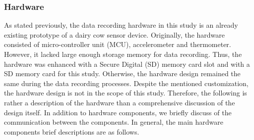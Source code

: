 \documentclass[english,12pt,a4paper,pdftex,elec,utf8]{aaltothesis}
\begin{document}
\subsubsection{Hardware} \label{hardwaresection}

As stated previously, the data recording hardware in this study is an already existing prototype of a dairy cow sensor device. Originally, the hardware consisted of micro-controller unit (MCU), accelerometer and thermometer. However, it lacked large enough storage memory for data recording. Thus, the hardware was enhanced with a Secure Digital (SD) memory card slot and with a SD memory card for this study. Otherwise, the hardware design remained the same during the data recording processes. Despite the mentioned customization, the hardware design is not in the scope of this study. Therefore, the following is rather a description of the hardware than a comprehensive discussion of the design itself. In addition to hardware components, we briefly discuss of the communication between the components. In general, the main hardware components brief descriptions are as follows.
\end{document}
